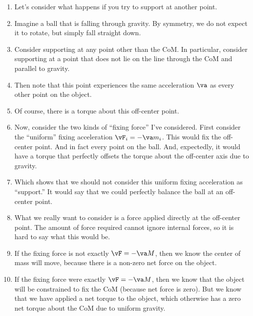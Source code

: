 \begin{enumerate}
  \item Let's consider what happens if you try to support at another
  point.

  \item Imagine a ball that is falling through gravity. By symmetry, we
  do not expect it to rotate, but simply fall straight down.

  \item Consider supporting at any point other than the CoM. In
  particular, consider supporting at a point that does not lie on the
  line through the CoM and parallel to gravity.

  \item Then note that this point experiences the same acceleration
  $\va$ as every other point on the object.

  \item Of course, there is a torque about this off-center point.

  \item Now, consider the two kinds of ``fixing force'' I've considered.
  First consider the ``uniform'' fixing acceleration $\vF_i = -\va m_i$.
  This would fix the off-center point. And in fact every point on the
  ball. And, expectedly, it would have a torque that perfectly offsets
  the torque about the off-center axis due to gravity.

  \item Which shows that we should not consider this uniform fixing
  acceleration as ``support.'' It would say that we could perfectly
  balance the ball at an off-center point.

  \item What we really want to consider is a force applied directly at
  the off-center point. The amount of force required cannot ignore
  internal forces, so it is hard to say what this would be.

  \item If the fixing force is not exactly $\vF = -\va M$, then we know
  the center of mass will move, because there is a non-zero net force on
  the object.

  \item If the fixing force were exactly $\vF = -\va M$, then we know
  that the object will be constrained to fix the CoM (because net force
  is zero). But we know that we have applied a net torque to the object,
  which otherwise has a zero net torque about the CoM due to uniform
  gravity.


\end{enumerate}
